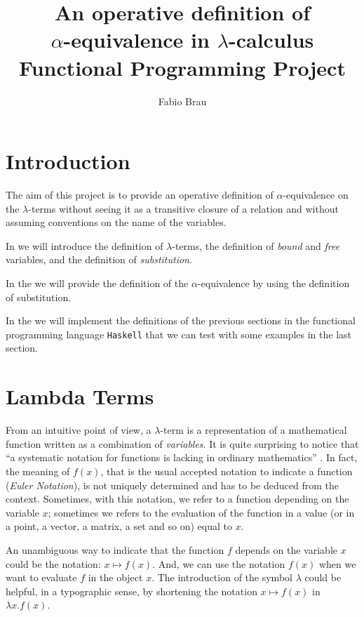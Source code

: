 \documentclass[a4paper,11pt]{article}
\title{An operative definition of \\
  $\alpha$-equivalence in
$\lambda$-calculus\\
{\large Functional Programming Project}}
\author{Fabio Brau}
\theoremstyle{definition}
\begin{document}
\maketitle
\tableofcontents
\section{Introduction}
The aim of this project is to provide an operative 
definition of $\alpha$-equivalence on the $\lambda$-terms without seeing 
it as a transitive closure of a relation and without assuming conventions 
on the name of the variables.

In  we will introduce the definition of
$\lambda$-terms, the definition of \textit{bound} and \textit{free}
variables, and the definition of \textit{substitution}.

In the  we will provide the definition of the
$\alpha$-equivalence by using the definition of substitution.

In the  we will implement the definitions of the
previous sections in the functional programming language \texttt{Haskell}
that we can test with some examples in the last section.

\section{Lambda Terms}
\label{sec:lambda-terms}
From an intuitive point of view, a $\lambda$-term is a representation of
a mathematical function written as a combination of \textit{variables}. It
is quite surprising to notice that ``a systematic notation for functions is lacking
in ordinary mathematics'' \cite{Curry}. In fact, the meaning of $f(x)$, that is the usual
accepted notation to indicate a function (\textit{Euler Notation}), is not uniquely
determined and has to be deduced from the context. Sometimes, with this
notation, we refer to a function depending on the variable $x$; sometimes we refers to the
evaluation of the function in a value (or in a point, a vector, a matrix, a
set and so on) equal to $x$.

An unambiguous way to indicate that the function $f$ depends on the variable $x$ 
could be the notation: $x\mapsto f(x)$. And, we can use the notation $f(x)$
when we want to evaluate $f$ in the object $x$. The introduction of the
symbol $\lambda$ could be helpful, in a typographic sense, by shortening the
notation $x\mapsto f(x)$ in $\lambda x.f(x)$.
\end{document}
